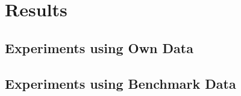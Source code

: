 \chapter{Results}

\graphicspath{ {report/Chapter6/assets/} } 

\section{Experiments using Own Data}

\section{Experiments using Benchmark Data}
